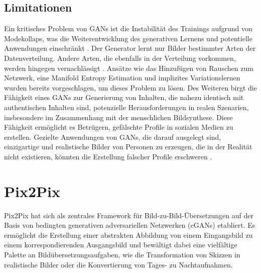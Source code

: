\subsection{Limitationen}
Ein kritisches Problem von GANs ist die Instabilität des Trainings aufgrund von Modekollaps, was die Weiterentwicklung des generativen Lernens und potentielle Anwendungen einschränkt \cite{Liu.2022}. Der Generator lernt nur Bilder bestimmter Arten der Datenverteilung.  Andere Arten, die ebenfalls in der Verteilung vorkommen, werden hingegen vernachlässigt \cite{Srivastava.2017}. Ansätze wie das Hinzufügen von Rauschen zum Netzwerk, eine Manifold Entropy Estimation \cite{Liu.2022} und implizites Variationslernen \cite{Srivastava.2017} wurden bereits vorgeschlagen, um dieses Problem zu lösen.
Des Weiteren birgt die Fähigkeit eines GANs zur Generierung von Inhalten, die nahezu identisch mit authentischen Inhalten sind, potenzielle Herausforderungen in realen Szenarien, insbesondere im Zusammenhang mit der menschlichen Bildsynthese. Diese Fähigkeit ermöglicht es Betrügern, gefälschte Profile in sozialen Medien zu erstellen. Gezielte Anwendungen von GANs, die darauf ausgelegt sind, einzigartige und realistische Bilder von Personen zu erzeugen, die in der Realität nicht existieren, könnten die Erstellung falscher Profile erschweren \cite{Aggarwal.2021}.


\section{Pix2Pix}
Pix2Pix hat sich als zentrales Framework für Bild-zu-Bild-Übersetzungen auf der Basis von bedingten generativen adversariellen Netzwerken (cGANs) etabliert. Es ermöglicht die Erstellung einer abstrakten Abbildung von einem Eingangsbild zu einem korrespondierenden Ausgangsbild und bewältigt dabei eine vielfältige Palette an Bildübersetzungsaufgaben, wie die Transformation von Skizzen in realistische Bilder oder die Konvertierung von Tages- zu Nachtaufnahmen.
  



